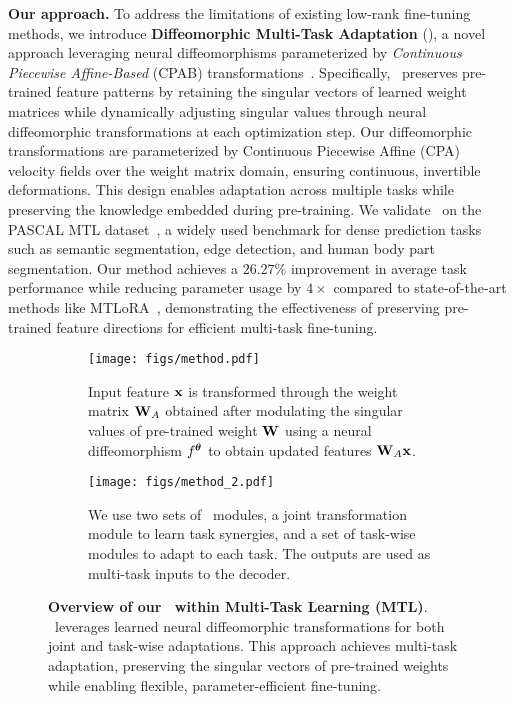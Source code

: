 \noindent\textbf{Our approach.} 
To address the limitations of existing low-rank fine-tuning methods, we introduce \textbf{Diffeomorphic Multi-Task Adaptation} (\textbf{\ourmethod}), a novel approach leveraging neural diffeomorphisms parameterized by \textit{Continuous Piecewise Affine-Based} (CPAB) transformations~\citep{freifeld2015highly, freifeld2017transformations}. Specifically, \ourmethod\ preserves pre-trained feature patterns by retaining the singular vectors of learned weight matrices while dynamically adjusting singular values through neural diffeomorphic transformations at each optimization step. 
Our diffeomorphic transformations are parameterized by Continuous Piecewise Affine (CPA)~\cite{freifeld2015highly,freifeld2017transformations} velocity fields over the weight matrix domain, ensuring continuous, invertible deformations. This design enables adaptation across multiple tasks while preserving the knowledge embedded during pre-training.
We validate \ourmethod\ on the PASCAL MTL dataset~\citep{pascal}, a widely used benchmark for dense prediction tasks such as semantic segmentation, edge detection, and human body part segmentation. Our method achieves a \(26.27\%\) improvement in average task performance while reducing parameter usage by \(4 \times\) compared to state-of-the-art methods like MTLoRA~\citep{agiza2024mtlora}, demonstrating the effectiveness of preserving pre-trained feature directions for efficient multi-task fine-tuning.

\begin{figure*}[!t]
    \centering
    \begin{subfigure}[c]{0.6\linewidth}
        \centering
        \texttt{[image: figs/method.pdf]}
        \caption{Input feature ${\mathbf{x}}$ is transformed through the weight matrix ${\mathbf{W}}_A$ obtained after modulating the singular values of pre-trained weight ${\mathbf{W}}$ using a neural diffeomorphism $f^{{\bm{\theta}}}$ to obtain updated features ${\mathbf{W}}_A {\mathbf{x}}$.}
        \label{fig:left}
    \end{subfigure}
    \hfill
    \begin{subfigure}[c]{0.3\linewidth}
        \centering
        \vspace{-0.75em}
        \texttt{[image: figs/method\_2.pdf]}
        \caption{We use two sets of \ourmethod\ modules, a joint transformation module to learn task synergies, and a set of task-wise modules to adapt to each task. The outputs are used as multi-task inputs to the decoder.} 
        \label{fig:overview_right}
    \end{subfigure}
    \caption{\textbf{Overview of our \ourmethod\ within Multi-Task Learning (MTL)}. \ourmethod\ leverages learned neural diffeomorphic transformations for both joint and task-wise adaptations. This approach achieves multi-task adaptation, preserving the singular vectors of pre-trained weights while enabling flexible, parameter-efficient fine-tuning.}
    \label{fig:side_by_side}
\end{figure*}

